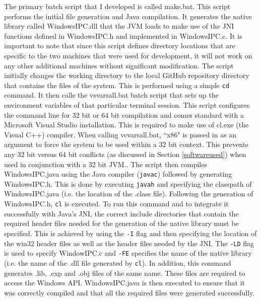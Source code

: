 \documentclass[12pt] {newrucsthesis}    %
\def\code#1{\texttt{#1}}
\begin{document}
        The primary batch script that I developed is called make.bat. This script performs
        the initial file generation and Java compilation. It generates the native library called
        WindowsIPC.dll that the JVM loads to make use of the JNI functions defined in WindowsIPC.h
        and implemented in WindowsIPC.c. It is important to note that since this script defines directory locations
        that are specific to the two machines that were used for development, it will not work on any other
        additional machines without significant modification. The script initially changes the working directory
        to the local GitHub repository directory that contains the files of the system. This is performed using a simple
        \code{cd} command. It then calls the vsvarsall.bat batch script that sets up the environment variables
        of that particular terminal session. This script configures the command line for 32 bit or 64 bit compilation and comes standard
        with a Microsoft Visual Studio installation. This is required to make use of cl.exe (the Visual C++) compiler.
        When calling vcvarsall.bat, ``x86" is passed in as an argument to force the system to be used within a
        32 bit context. This prevents any 32 bit versus 64 bit conflicts (as discussed in Section \ref{softwareused})
        when used in conjunction with a 32 bit JVM.\citep{ENVBUILDS}.
        The script then compiles WindowsIPC.java using the Java compiler (\code{javac}) followed by generating
        WindowsIPC.h. This is done by executing \code{javah} and specifying the classpath of WindowsIPC.java
        (i.e. the location of the .class file). Following the generation of WindowsIPC.h, \code{cl} is
        executed. To run this command and to integrate it successfully with Java's JNI, the correct
        include directories that contain the required header files needed for
        the generation of the native library must be specified. This is achieved by using the \code{-I} flag
        and then specifying the location of the win32 header files as well as the header files needed by the JNI.
        The \code{-LD} flag is used to specify WindowIPC.c and \code{-FE} specifies the name of the native library (i.e.
        the name of the .dll file generated by \code{cl}).
        In addition, this command generates .lib, .exp and .obj files of the same name.
        These files are required to access the Windows API. %
        WindowsIPC.java is then executed to ensure that it was correctly
        compiled and that all the required files were generated successfully.
\end{document}
